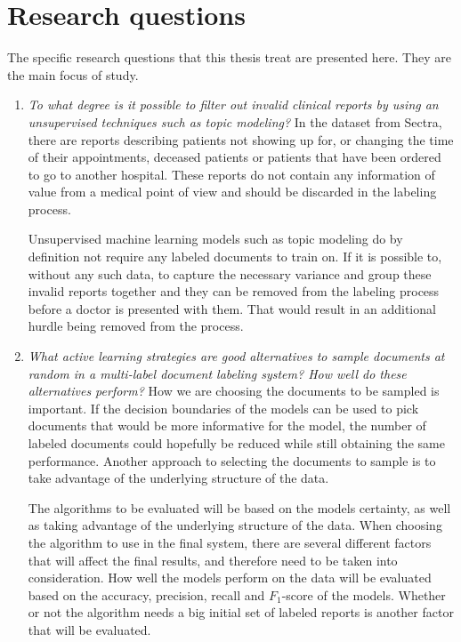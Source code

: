 \section{Research questions}
\label{sec:research-questions}

The specific research questions that this thesis treat are presented here.
They are the main focus of study.

\begin{enumerate}

\item \textit{To what degree is it possible to filter out invalid clinical reports by using an unsupervised techniques such as topic modeling?}
      \newline
      In the dataset from Sectra, there are reports describing patients not showing up for, or changing the time of their appointments, deceased patients or patients that have been ordered to go to another hospital.
      These reports do not contain any information of value from a medical point of view and should be discarded in the labeling process.

      Unsupervised machine learning models such as topic modeling do by definition not require any labeled documents to train on.
      If it is possible to, without any such data, to capture the necessary variance and group these invalid reports together and they can be removed from the labeling process before a doctor is presented with them.
      That would result in an additional hurdle being removed from the process.

\item \label{intro:re-q2} 
      \textit{What active learning strategies are good alternatives to sample documents at random in a multi-label document labeling system? How well do these alternatives perform?}
      \newline
      How we are choosing the documents to be sampled is important.
      If the decision boundaries of the models can be used to pick documents that would be more informative for the model, the number of labeled documents could hopefully be reduced while still obtaining the same performance.
      Another approach to selecting the documents to sample is to take advantage of the underlying structure of the data.

      The algorithms to be evaluated will be based on the models certainty, as well as taking advantage of the underlying structure of the data.
      When choosing the algorithm to use in the final system, there are several different factors that will affect the final results, and therefore need to be taken into consideration.
      How well the models perform on the data will be evaluated based on the accuracy, precision, recall and $F_1$-score of the models.
      Whether or not the algorithm needs a big initial set of labeled reports is another factor that will be evaluated.


\end{enumerate}
